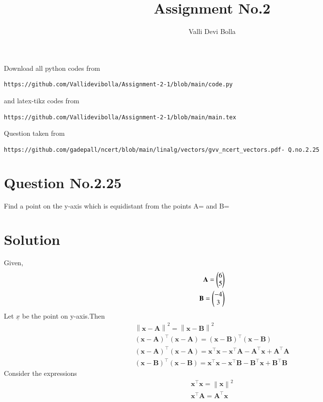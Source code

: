 \documentclass[journal,12pt,twocolumn]{IEEEtran}
\newcommand{\norm}[1]{\left\lVert#1\right\rVert}
\begin{document}
\makeatother
\let\StandardTheFigure\thefigure
\let\vec\mathbf
\renewcommand{\thefigure}{\theproblem}
\def\putbox#1#2#3{\makebox[0in][l]{\makebox[#1][l]{}\raisebox{\baselineskip}[0in][0in]{\raisebox{#2}[0in][0in]{#3}}}}
     \def\rightbox#1{\makebox[0in][r]{#1}}
     \def\centbox#1{\makebox[0in]{#1}}
     \def\topbox#1{\raisebox{-\baselineskip}[0in][0in]{#1}}
     \def\midbox#1{\raisebox{-0.5\baselineskip}[0in][0in]{#1}}
\vspace{3cm}
\title{Assignment No.2}
\author{Valli Devi Bolla}
\maketitle
\newpage
\bigskip
\renewcommand{\thefigure}{\theenumi}
\renewcommand{\thetable}{\theenumi}
Download all python codes from 
\begin{lstlisting}
https://github.com/Vallidevibolla/Assignment-2-1/blob/main/code.py
\end{lstlisting}
%
and latex-tikz codes from 
%
\begin{lstlisting}
https://github.com/Vallidevibolla/Assignment-2-1/blob/main/main.tex
\end{lstlisting}
%
Question taken from
\begin{lstlisting}
https://github.com/gadepall/ncert/blob/main/linalg/vectors/gvv_ncert_vectors.pdf- Q.no.2.25 
\end{lstlisting}
%
\section{Question No.2.25}
Find a point on the y-axis which is equidistant from the points A= and B=
\section{Solution}
Given, 
\begin{align}
\vec{A}=\myvec{6\\5} \\
\vec{B}=\myvec{-4\\3}
\end{align}
Let $\underline{x}$ be the point on y-axis.Then\\
\begin{align}
\boxed{\norm{\vec{x}-\vec{A}}^2=\norm{\vec{x}-\vec{B}}^2 }\\
\boxed{(\vec{x}-\vec{A})^{\top}(\vec{x}-\vec{A})=(\vec{x}-\vec{B})^{\top}(\vec{x}-\vec{B})}
\\
(\vec{x}-\vec{A})^{\top}(\vec{x}-\vec{A})=\vec{x}^{\top} \vec{x}-\vec{x}^{\top} \vec{A}-\vec{A}^{\top} \vec{x}+\vec{A}^{\top} \vec{A}
\\
(\vec{x}-\vec{B})^{\top}(\vec{x}-\vec{B})=\vec{x}^{\top} \vec{x}-\vec{x}^{\top} \vec{B}-\vec{B}^{\top} \vec{x}+\vec{B}^{\top} \vec{B}
\end{align}
Consider the expressions 
\begin{align}
\vec{x}^{\top} \vec{x}=\norm{\vec{x}}^2\\
\vec{x}^{\top} \vec{A}=\vec{A}^{\top} \vec{x}
\end{align}
\end{document}
